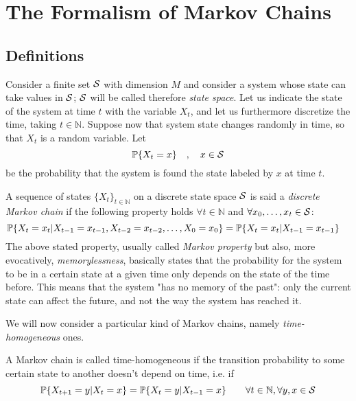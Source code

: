 \chapter{The Formalism of Markov Chains}
\label{ch:markov_chains}
\section{Definitions}
Consider a finite set $\mathcal{S}$ with dimension $M$ and consider a system whose state can take values in $\mathcal{S}$; $\mathcal{S}$ will be called therefore \emph{state space}. Let us indicate the state of the system at time $t$ with the variable $X_t$, and let us furthermore discretize the time, taking $t \in \mathbb{N}$. Suppose now that system state changes randomly in time, so that $X_t$ is a random variable. Let
\begin{equation}
    \mathbb{P}\{X_t = x\} \quad , \quad x \in \mathcal{S}
\end{equation}
be the probability that the system is found the state labeled by $x$ at time $t$.

\begin{ndef}  \label{def:markov-chain}
    A sequence of states $\{X_t\}_{t\in \mathbb{N}}$ on a discrete state space $\mathcal{S}$ is said a \emph{discrete Markov chain} if the following property holds $\forall t \in \mathbb N$ and $\forall x_0, \dots, x_t \in \mathcal{S}$:
    \begin{equation}
        \mathbb{P}\{ X_t = x_t | X_{t-1} = x_{t-1}, X_{t-2} = x_{t-2}, \dots, X_0 = x_0 \} = \mathbb{P}\{ X_t = x_t | X_{t-1} = x_{t-1} \} \quad
    \end{equation}
The above stated property, usually called \emph{Markov property} but also, more evocatively, \emph{memorylessness}, basically states that the probability for the system to be in a certain state at a given time only depends on the state of the time before. This means that the system "has no memory of the past": only the current state can affect the future, and not the way the system has reached it.
\end{ndef}

We will now consider a particular kind of Markov chains, namely \emph{time-homogeneous} ones.
\begin{ndef}  A Markov chain is called time-homogeneous if the transition probability to some certain state to another doesn't depend on time, i.e. if
    \begin{equation}
        \mathbb{P}\{X_{t+1} = y | X_{t} = x\} = \mathbb{P}\{X_{t} = y | X_{t-1} = x\} \quad \quad \forall t\in \mathbb{N}, \forall y, x \in \mathcal{S}
    \end{equation}
\end{ndef}

